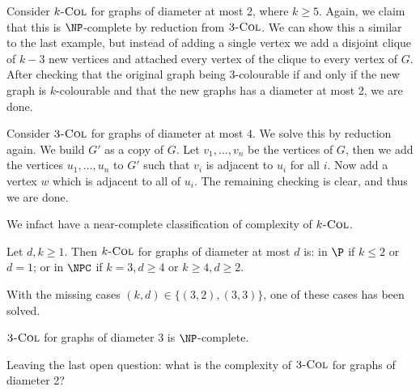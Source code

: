 \begin{example}
  Consider $\text{\normalfont \textsc{$k$-Col}}$ for graphs of diameter at most 2, where $k \geq 5$. Again, we claim that this is $\NP$-complete by reduction from $\text{\normalfont \textsc{3-Col}}$. We can show this a similar to the last example, but instead of adding a single vertex we add a disjoint clique of $k-3$ new vertices and attached every vertex of the clique to every vertex of $G$. After checking that the original graph being $3$-colourable if and only if the new graph is $k$-colourable and that the new graphs has a diameter at most 2, we are done. 
\end{example}

\begin{example}
  Consider $\text{\normalfont \textsc{3-Col}}$ for graphs of diameter at most $4$. We solve this by reduction again. We build $G'$ as a copy of $G$. Let $v_1, \ldots, v_n$ be the vertices of $G$, then we add the vertices $u_1, \ldots, u_n$ to $G'$ such that $v_i$ is adjacent to $u_i$ for all $i$. Now add a vertex $w$ which is adjacent to all of $u_i$. The remaining checking is clear, and thus we are done. 
\end{example}

We infact have a near-complete classification of complexity of $\text{\normalfont \textsc{$k$-Col}}$.

\begin{theorem}
  Let $d, k \geq 1$. Then $\text{\normalfont \textsc{$k$-Col}}$ for graphs of diameter at most $d$ is: in $\P$ if $k \leq 2$ or $d = 1$; or in $\NPC$ if $k = 3, d \geq 4$ or $k \geq 4, d \geq 2$.
\end{theorem}

With the missing cases $(k,d) \in \{(3,2), (3,3)\}$, one of these cases has been solved.

\begin{theorem}
  $\text{\normalfont \textsc{3-Col}}$ for graphs of diameter 3 is $\NP$-complete.
\end{theorem}

Leaving the last open question: what is the complexity of $\text{\normalfont \textsc{3-Col}}$ for graphs of diameter 2?